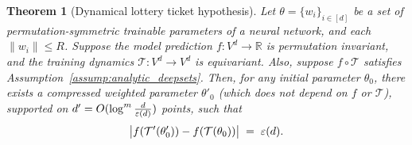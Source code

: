 \documentclass{article}
\theoremstyle{plain}
\newtheorem{theorem}{Theorem}
\newtheorem{hypothesis}{Hypothesis}
\def\REV#1{{\color[HTML]{000000}#1}}
\begin{document}
\begin{theorem}[Dynamical lottery ticket hypothesis]\label{thm:DLTH}
    Let $\theta = \{w_i\}_{i\in[d]}$ be a set of permutation-symmetric trainable parameters of a neural network, and each $\|w_i\| \leq R$. Suppose the model prediction $f: V^d\to \mathbb{R}$ is permutation invariant, and the training dynamics $\mathcal{T}: V^d\to V^d$ is equivariant. Also, suppose $f\circ\mathcal{T}$ satisfies Assumption~\ref{assump:analytic_deepsets}. Then, for any initial parameter $\theta_0$, there exists a compressed weighted parameter $\theta'_0$ \REV{(which does not depend on $f$ or $\mathcal{T}$)}, supported on $d' = O (\log^m \tfrac{d}{\REV{\varepsilon}(d)})$ points, such that
    \begin{equation}
        \big| f(\mathcal{T}'(\theta'_0)) - f(\mathcal{T}(\theta_0)) \big| \;=\; \REV{\varepsilon}(d) .
    \end{equation}
\end{theorem}



\end{document}
